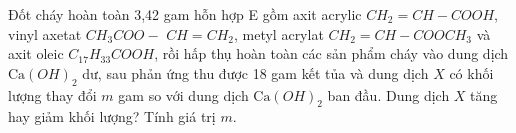 \begin{vd}
	Đốt cháy hoàn toàn 3,42 gam hỗn hợp E gồm axit acrylic $CH_2=CH-COOH$, vinyl axetat $CH_3 COO-$ $CH=CH_2$, metyl acrylat $CH_2=CH-COOCH_3$ và axit oleic $C_{17} H_{33} COOH$, rồi hấp thụ hoàn toàn các sản phẩm cháy vào dung dịch $\mathrm{Ca}(OH)_2$ dư, sau phản ứng thu được 18 gam kết tủa và dung dịch $X$ có khối lượng thay đổi $m$ gam so với dung dịch $\mathrm{Ca}(OH)_2$ ban đầu. Dung dịch $X$ tăng hay giảm khối lượng? Tính giá trị $m$.
	\loigiai{
	}
\end{vd}

